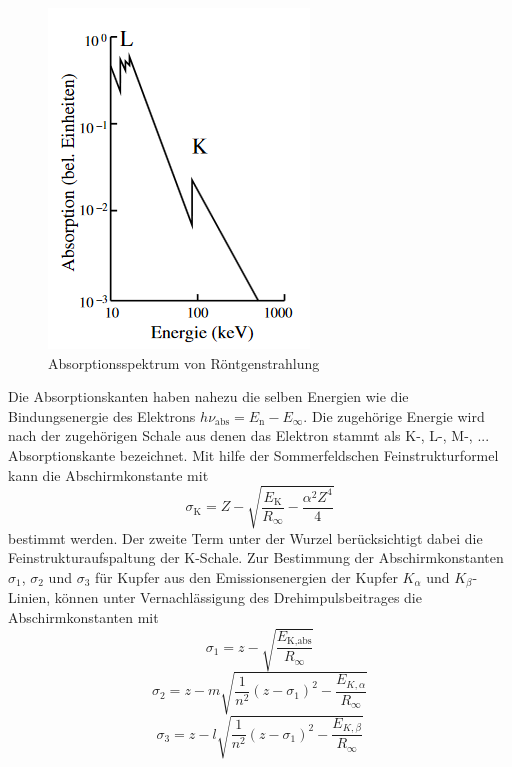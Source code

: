 \begin{figure}
    \centering
    \caption{Absorptionsspektrum von Röntgenstrahlung \cite{}}
    \label{fig:abso}
    \includegraphics[width = 0.6 \textwidth]{pics/abso.png}
\end{figure}
Die Absorptionskanten haben nahezu die selben Energien wie die Bindungsenergie des Elektrons $h \nu_\text{abs}= E_\text{n} - E_{\infty}$. Die zugehörige Energie wird nach der zugehörigen Schale aus denen das Elektron stammt als K-, L-, M-, ... Absorptionskante bezeichnet. 
Mit hilfe der Sommerfeldschen Feinstrukturformel kann die Abschirmkonstante mit
\begin{equation}
    \sigma_\text{K}=Z-\sqrt{\frac{E_\text{K}}{R_{\infty}}-\frac{\alpha^2 Z^4}{4}}
    \label{eqn:abschirmkonstante}
\end{equation}
bestimmt werden. Der zweite Term unter der Wurzel berücksichtigt dabei die Feinstrukturaufspaltung der K-Schale.
Zur Bestimmung der Abschirmkonstanten $\sigma_1$, $\sigma_2$ und $\sigma_3$ für Kupfer aus den Emissionsenergien der Kupfer $K_\alpha$ und $K_\beta$-Linien, können unter Vernachlässigung des Drehimpulsbeitrages die Abschirmkonstanten mit
\begin{equation}
    \sigma_1=z-\sqrt{\frac{E_\text{K,abs}}{R_\infty}}
    \label{eqn:si1}
\end{equation}
\begin{equation}
    \sigma_2=z- m \sqrt{\frac{1}{n^2} (z- \sigma_1)^2-\frac{E_{K,\alpha}}{R_\infty}}
    \label{eqn:si2}
\end{equation}
\begin{equation}
    \sigma_3=z- l \sqrt{\frac{1}{n^2} (z- \sigma_1)^2-\frac{E_{K,\beta}}{R_\infty}}
    \label{eqn:si3}
\end{equation}
